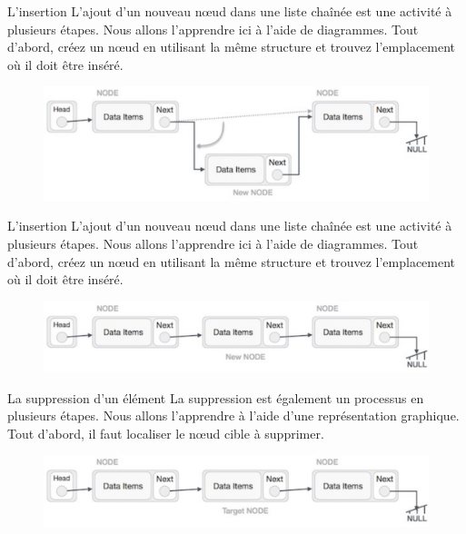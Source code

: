 \documentclass[10pt,xcolor=dvipsnames]{beamer}
\begin{document}
\begin{frame}{L'insertion}
    L'ajout d'un nouveau nœud dans une liste chaînée est une activité à plusieurs étapes. Nous allons l'apprendre ici à l'aide de diagrammes. Tout d'abord, créez un nœud en utilisant la même structure et trouvez l'emplacement où il doit être inséré.
    
    \begin{figure}
        \centering
        \includegraphics[scale=0.25]{figures/CM2/list-diag-3.png}
        \label{fig:my_label}
    \end{figure}
\end{frame}
\begin{frame}{L'insertion}
    L'ajout d'un nouveau nœud dans une liste chaînée est une activité à plusieurs étapes. Nous allons l'apprendre ici à l'aide de diagrammes. Tout d'abord, créez un nœud en utilisant la même structure et trouvez l'emplacement où il doit être inséré.
    
    \begin{figure}
        \centering
        \includegraphics[scale=0.25]{figures/CM2/list-diag-4.png}
        \label{fig:my_label}
    \end{figure}
\end{frame}


\begin{frame}{La suppression d'un élément}
La suppression est également un processus en plusieurs étapes. Nous allons l'apprendre à l'aide d'une représentation graphique. Tout d'abord, il faut localiser le nœud cible à supprimer.
        \begin{figure}
        \centering
        \includegraphics[scale=0.25]{figures/CM2/list-del-1.png}
        \label{fig:my_label}
    \end{figure}
    
\end{frame}
\end{document}
